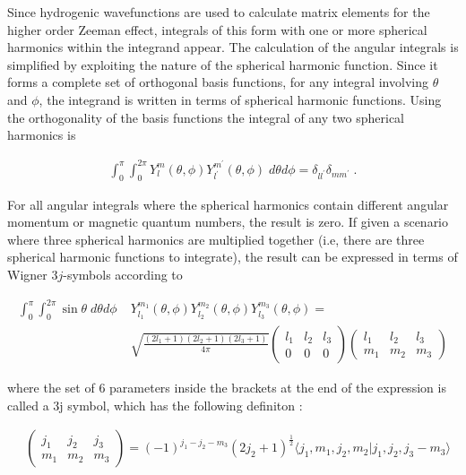         \noindent Since hydrogenic wavefunctions are used to calculate matrix elements for the higher order Zeeman effect, integrals of this form with one or more spherical harmonics within the integrand appear. The calculation of the angular integrals is simplified by exploiting the nature of the spherical harmonic function. Since it forms a complete set of orthogonal basis functions, for any integral involving $\theta$ and $\phi$, the integrand is written in terms of spherical harmonic functions. Using the orthogonality of the basis functions the integral of any two spherical harmonics is

        \begin{align}
            \int_0^\pi \int_0^{2\pi} Y^m_l(\theta, \phi) Y^{m^\prime}_{l^\prime} (\theta, \phi) \; d\theta d\phi = \delta_{ll^\prime} \delta_{mm^\prime}\label{eq:delta_spherical_harmonic}\;.
        \end{align}

        For all angular integrals where the spherical harmonics contain different angular momentum or magnetic quantum numbers, the result is zero. If given a scenario where three spherical harmonics are multiplied together (i.e, there are three spherical harmonic functions to integrate), the result can be expressed in terms of Wigner $3j$-symbols according to \cite{Wigner-3j}

        \begin{align}
            \int_0^\pi \int_0^{2\pi} \sin \theta \; d\theta d\phi\;& Y^{m_1}_{l_1}(\theta, \phi) Y^{m_2}_{l_2} (\theta, \phi) Y^{m_3}_{l_3} (\theta, \phi) =\\
             &\sqrt{\frac{(2l_1 + 1)(2l_2 + 1) (2l_3 + 1)}{4 \pi}} \begin{pmatrix}
                l_1 & l_2 & l_3 \\
                0 & 0 & 0
            \end{pmatrix} \begin{pmatrix}
                l_1 & l_2 & l_3 \\
                m_1 & m_2 & m_3 
            \end{pmatrix} \nonumber
        \end{align}

        \noindent where the set of $6$ parameters inside the brackets at the end of the expression is called a $3$j symbol, which has the following definiton \cite{edmonds_book}:

        \begin{align} \label{3j_1}
            &\begin{pmatrix}
                j_1 & j_2 & j_3\\
                m_1 & m_2 & m_3
            \end{pmatrix} = (-1)^{j_1 - j_2 - m_3} \left( 2j_2 + 1\right)^{\frac{1}{2}} \langle j_1, m_1, j_2, m_2 \vert j_1, j_2, j_3 - m_3 \rangle
        \end{align}

